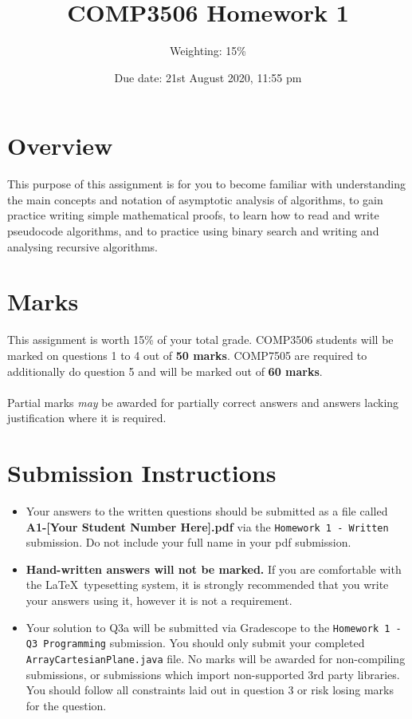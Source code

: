 \documentclass[a4,13pt]{extarticle}
\title{COMP3506 Homework 1}
\author{Weighting: 15\%}
\date{Due date: 21st August 2020, 11:55 pm}
\begin{document}
\maketitle
{}
\section*{Overview}
This purpose of this assignment is for you to become familiar with understanding the main concepts and notation of asymptotic analysis of algorithms, to gain practice writing simple mathematical proofs, to learn how to read and write pseudocode algorithms, and to practice using binary search and writing and analysing recursive algorithms.

\section*{Marks}
This assignment is worth 15\% of your total grade. COMP3506 students will be marked on questions 1 to 4 out of \textbf{50 marks}. COMP7505 are required to additionally do question 5 and will be marked out of \textbf{60 marks}.\\\\
Partial marks \textit{may} be awarded for partially correct answers and answers lacking justification where it is required.

\section*{Submission Instructions}
\begin{itemize}
	\item Your answers to the written questions should be submitted as a file called \textbf{A1-[Your Student Number Here].pdf} via the \texttt{Homework 1 - Written} submission. Do not include your full name in your pdf submission.
	\item \textbf{Hand-written answers will not be marked.} If you are comfortable with the \LaTeX\  typesetting
	      system, it is strongly recommended that you write your answers using it, however it is not a requirement.
	\item Your solution to Q3a will be submitted via Gradescope to the \texttt{Homework 1 - Q3 Programming} submission. You should only submit your completed \texttt{ArrayCartesianPlane.java} file. No marks will be awarded for non-compiling submissions, or submissions which import non-supported 3rd party libraries. You should follow all constraints laid out in question 3 or risk losing marks for the question.
\end{itemize}
\end{document}
